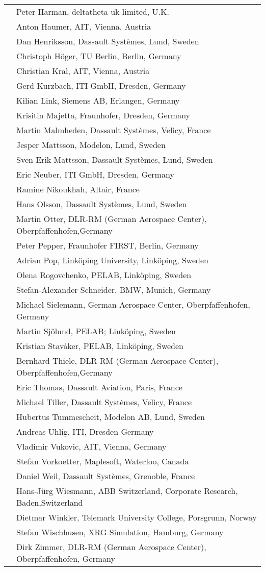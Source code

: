\documentclass[../MLS.tex]{subfiles}
\begin{document}
\begin{longtable}{p{0.3cm}p{14cm}}
&Peter Harman, deltatheta uk limited, U.K.\\
&Anton Haumer, AIT, Vienna, Austria\\
&Dan Henriksson, Dassault Systèmes, Lund, Sweden\\
&Christoph Höger, TU Berlin, Berlin, Germany\\
&Christian Kral, AIT, Vienna, Austria\\
&Gerd Kurzbach, ITI GmbH, Dresden, Germany\\
&Kilian Link, Siemens AB, Erlangen, Germany\\
&Krisitin Majetta, Fraunhofer, Dresden, Germany\\
&Martin Malmheden, Dassault Systèmes, Velicy, France\\
&Jesper Mattsson, Modelon, Lund, Sweden\\
&Sven Erik Mattsson, Dassault Systèmes, Lund, Sweden\\
&Eric Neuber, ITI GmbH, Dresden, Germany\\
&Ramine Nikoukhah, Altair, France\\
&Hans Olsson, Dassault Systèmes, Lund, Sweden\\
&Martin Otter, DLR-RM (German Aerospace Center), Oberpfaffenhofen,Germany\\
&Peter Pepper, Fraunhofer FIRST, Berlin, Germany\\
&Adrian Pop, Linköping University, Linköping, Sweden\\
&Olena Rogovchenko, PELAB, Linköping, Sweden\\
&Stefan-Alexander Schneider, BMW, Munich, Germany\\
&Michael Sielemann, German Aerospace Center, Oberpfaffenhofen, Germany\\
&Martin Sjölund, PELAB; Linköping, Sweden\\
&Kristian Stavåker, PELAB, Linköping, Sweden\\
&Bernhard Thiele, DLR-RM (German Aerospace Center), Oberpfaffenhofen,Germany\\
&Eric Thomas, Dassault Aviation, Paris, France\\
&Michael Tiller, Dassault Systèmes, Velicy, France\\
&Hubertus Tummescheit, Modelon AB, Lund, Sweden\\
&Andreas Uhlig, ITI, Dresden Germany\\
&Vladimir Vukovic, AIT, Vienna, Germany\\
&Stefan Vorkoetter, Maplesoft, Waterloo, Canada\\
&Daniel Weil, Dassault Systèmes, Grenoble, France\\
&Hans-Jürg Wiesmann, ABB Switzerland, Corporate Research, Baden,Switzerland\\
&Dietmar Winkler, Telemark University College, Porsgrunn, Norway\\
&Stefan Wischhusen, XRG Simulation, Hamburg, Germany\\
&Dirk Zimmer, DLR-RM (German Aerospace Center), Oberpfaffenhofen, Germany
\end{longtable}
\end{document}

